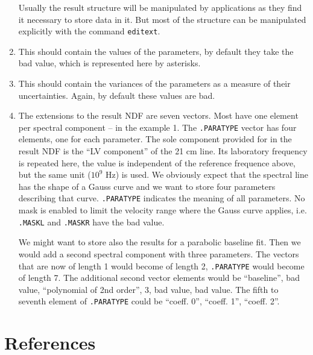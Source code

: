 \begin{enumerate}
Usually the result structure will be manipulated by applications as they find
it necessary to store data in it. But most of the structure can be manipulated
explicitly with the command {\tt editext}.

\item This should contain the values of the parameters, by default they take
the bad value, which is represented here by asterisks.

\item This should contain the variances of the parameters as a measure of their
uncertainties. Again, by default these values are bad.

\item The extensions to the result NDF are seven vectors. Most have one element
per spectral component -- in the example 1. The {\tt .PARATYPE} vector has four
elements, one for each parameter. The sole component provided for in the result
NDF is the ``LV component'' of the 21 cm line. Its laboratory frequency is
repeated here, the value is independent of the reference frequence above, but
the same unit ($10^9$ Hz) is used. We obviously expect that the spectral line
has the shape of a Gauss curve and we want to store four parameters describing
that curve. {\tt .PARATYPE} indicates the meaning of all parameters. No mask is
enabled to limit the velocity range where the Gauss curve applies, i.e. {\tt
.MASKL} and {\tt .MASKR} have the bad value.

We might want to store also the results for a parabolic baseline fit. Then we
would add a second spectral component with three parameters. The vectors that
are now of length 1 would become of length 2, {\tt .PARATYPE} would become of
length 7. The additional second vector elements would be ``baseline'', bad
value, ``polynomial of 2nd order'', 3, bad value, bad value. The fifth to
seventh element of {\tt .PARATYPE} could be ``coeff. 0'', ``coeff. 1'',
``coeff. 2''.

\end{enumerate}


%


\goodbreak
\section{References}
\label{refer}

